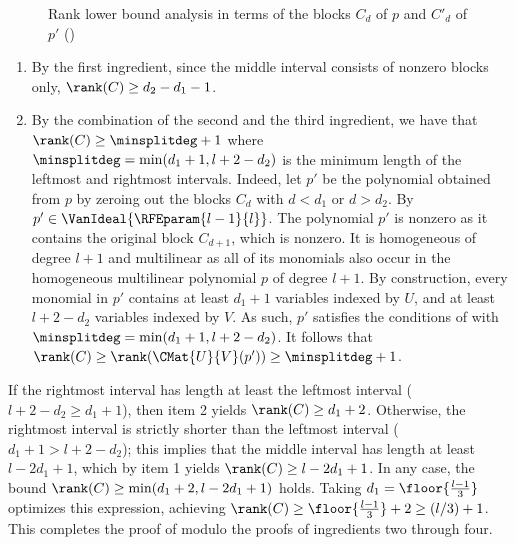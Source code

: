 \documentclass{toc}
\begin{document}
\begin{figure}
\begin{center}
\end{center}
\caption{Rank lower bound analysis in terms of the blocks $C_d$ of $p$ and $C'_d$ of $p'$ ()}\label{fig.roabp}
\end{figure}
\begin{enumerate}
  \item By the first ingredient, since the middle interval consists of nonzero blocks only, $\rank(C) \ge d_2-d_1-1$.
  \item By the combination of the second and the third ingredient, we have that $\rank(C) \ge \minsplitdeg+1$
    where $\minsplitdeg = \min(d_1+1,l+2-d_2)$ is the minimum length of the leftmost and rightmost intervals.
    Indeed, let $p'$ be the polynomial obtained from $p$ by zeroing out the blocks $C_d$ with $d < d_1$ or $d > d_2$. By  $p' \in \VanIdeal{\RFEparam{l-1}{l}}$. The polynomial $p'$ is nonzero as it contains the original block $C_{d+1}$, which is nonzero. It is homogeneous of degree $l+1$ and multilinear as all of its monomials also occur in the homogeneous multilinear polynomial $p$ of degree $l+1$. By construction, every monomial in $p'$ contains at least $d_1+1$ variables indexed by $U$, and at least $l+2-d_2$ variables indexed by $V$. As such, $p'$ satisfies the conditions of  with $\minsplitdeg = \min(d_1+1,l+2-d_2)$. It follows that $\rank(C) \ge \rank(\CMat{U}{V}(p')) \ge \minsplitdeg+1$.
\end{enumerate}
If the rightmost interval has length at least the leftmost interval ($l+2-d_2 \ge d_1+1$),
then item 2 yields $\rank(C) \ge d_1+2$.
Otherwise, the rightmost interval is strictly shorter than the leftmost interval
($d_1+1 > l+2-d_2$);
this implies that the middle interval has length at least \(l - 2d_1 + 1\),
which by item 1 yields $\rank(C) \ge l-2d_1+1$.
In any case, the bound $\rank(C) \ge \min(d_1+2,l-2d_1+1)$ holds.
Taking $d_1= \floor{\frac{l-1}{3}}$ optimizes this expression,
achieving $\rank(C) \ge \floor{\frac{l-1}{3}} + 2 \ge (l/3)+1$.
This completes the proof of  modulo the
proofs of ingredients two through four.
\end{document}
